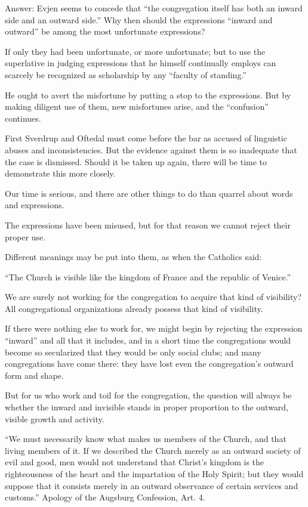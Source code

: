 Answer: Evjen seems to concede that “the congregation itself has both an inward side and an outward side.” Why then should the expressions “inward and outward” be among the most unfortunate expressions?

If only they had been unfortunate, or more unfortunate; but to use the superlative in judging expressions that he himself continually employs can scarcely be recognized as scholarship by any “faculty of standing.”

He ought to avert the misfortune by putting a stop to the expressions. But by making diligent use of them, new misfortunes arise, and the “confusion” continues.

First Sverdrup and Oftedal must come before the bar as accused of linguistic abuses and inconsistencies. But the evidence against them is so inadequate that the case is dismissed. Should it be taken up again, there will be time to demonstrate this more closely.

Our time is serious, and there are other things to do than quarrel about words and expressions.

The expressions have been misused, but for that reason we cannot reject their proper use.

Different meanings may be put into them, as when the Catholics said:

“The Church is visible like the kingdom of France and the republic of Venice.”

We are surely not working for the congregation to acquire that kind of visibility? All congregational organizations already possess that kind of visibility.

If there were nothing else to work for, we might begin by rejecting the expression “inward” and all that it includes, and in a short time the congregations would become so secularized that they would be only social clubs; and many congregations have come there: they have lost even the congregation’s outward form and shape.

But for us who work and toil for the congregation, the question will always be whether the inward and invisible stands in proper proportion to the outward, visible growth and activity.

“We must necessarily know what makes us members of the Church, and that living members of it. If we described the Church merely as an outward society of evil and good, men would not understand that Christ’s kingdom is the righteousness of the heart and the impartation of the Holy Spirit; but they would suppose that it consists merely in an outward observance of certain services and customs.” Apology of the Augsburg Confession, Art. 4.

